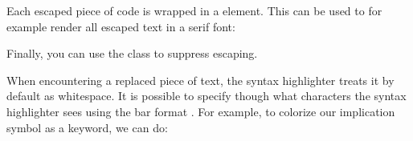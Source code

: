 \documentclass{book}
\begin{document}
\begin{mdP}[data-line={767}]%
{}Each escaped piece of code is wrapped in a %
{}%
{} element. 
This can be used to for example render all escaped text in a serif font:%
\end{mdP}%
\begin{mdPre}[class={para-block,pre-indented,language-madoko,lang-madoko,madoko,highlighted},language={madoko},data-line={770}]%
%
\end{mdPre}%
\begin{mdP}[data-line={772}]%
{}Finally, you can use the %
{}%
{} class to suppress escaping.%
\end{mdP}%
\begin{mdP}[class={indent},data-line={774}]%
{}When encountering a replaced piece of text, the syntax highlighter treats
it by default as whitespace. It is possible to specify though what characters
the syntax highlighter sees using the bar format %
{}\mdCode[class={code,code1}]{\mdSpan[class={code-escaped}]{}}%
{}.
For example, to colorize our implication symbol as a keyword, we can do:%
\end{mdP}%
\end{document}
